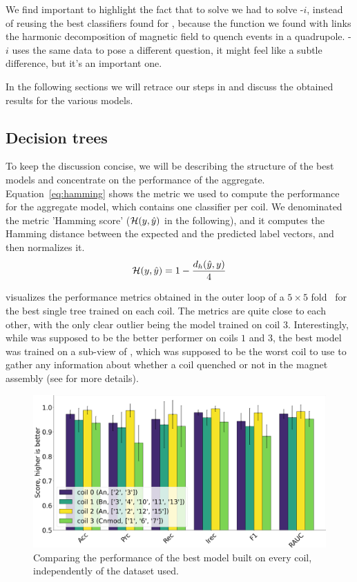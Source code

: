 \smallskip

We find important to highlight the fact that to solve \qlp we had to solve \qrp-$i$, instead of
reusing the best classifiers found for \qrp, because the function we found with \qrp links the
harmonic decomposition of magnetic field to quench events in a quadrupole. \qrp-$i$ uses the same
data to pose a different question, it might feel like a subtle difference, but it's an important
one.

In the following sections we will retrace our steps in  and discuss the obtained results for the various models.

\subsection{Decision trees}
To keep the discussion concise, we will be describing the structure of the best models and
concentrate on the performance of the aggregate. Equation~\ref{eq:hamming} shows the metric we used to
compute the performance for the aggregate model, which contains one classifier per coil. We
denominated the metric 'Hamming score' ($\mathcal{H}(y, \hat{y})$ in the following), and it computes the Hamming
distance between the expected and the predicted label vectors, and then normalizes it.
\begin{equation}
	\label{eq:hamming}
	\mathcal{H}(y, \hat{y}) = 1 - \frac{d_h(\hat{y}, y)}{4}
\end{equation}

 visualizes the performance metrics obtained in the outer loop of a $5\times5$
fold \ncv\ for the best single tree trained on each coil. The metrics are quite close to each other,
with the only clear outlier being the model trained on coil $3$. Interestingly, while \bn was
supposed to be the better performer on coils $1$ and $3$, the best model was trained on a sub-view
of \cnmod, which was supposed to be the worst coil to use to gather any information about whether a
coil quenched or not in the magnet assembly (see  for more details).
\begin{figure}[!ht]
	\centering
	\includegraphics[width=0.7\linewidth]{img/best_dts_qlp.png}
	\caption{Comparing the performance of the best model built on every coil, independently of
		the dataset used.} \label{fig:bdts-qlp}
\end{figure}

